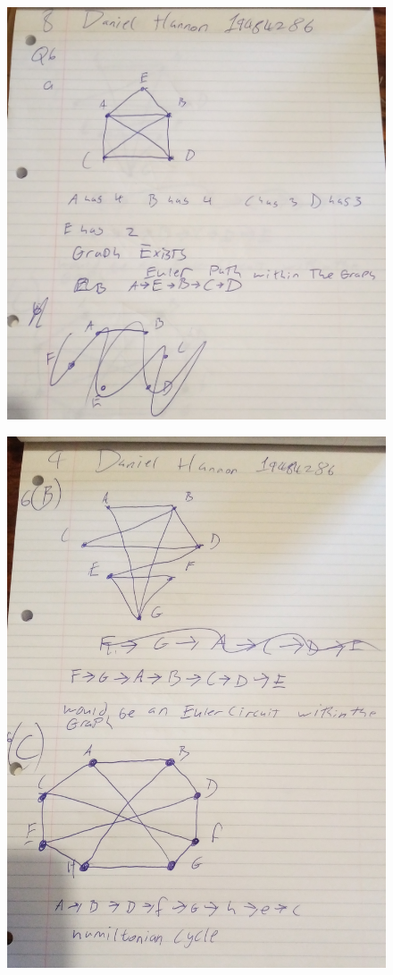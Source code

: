 \documentclass{article}
\begin{document}
	\newpage
	\begin{figure}
		\centering
		\includegraphics[width=\textwidth]{IMG_20210118_112024.jpg}
	\end{figure}
	\newpage
	\begin{figure}
		\centering
		\includegraphics[width=\textwidth]{IMG_20210118_112040.jpg}
	\end{figure}
\end{document}
